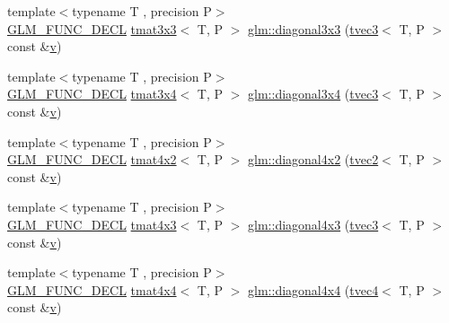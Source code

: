 \begin{DoxyCompactItemize}
\item 
{\footnotesize template$<$typename T , precision P$>$ }\\\mbox{\hyperlink{setup_8hpp_ab2d052de21a70539923e9bcbf6e83a51}{G\+L\+M\+\_\+\+F\+U\+N\+C\+\_\+\+D\+E\+CL}} \mbox{\hyperlink{structglm_1_1tmat3x3}{tmat3x3}}$<$ T, P $>$ \mbox{\hyperlink{group__gtx__matrix__operation_ga8e817dba22f2305cdebae07bbbe0360c}{glm\+::diagonal3x3}} (\mbox{\hyperlink{structglm_1_1tvec3}{tvec3}}$<$ T, P $>$ const \&\mbox{\hyperlink{glad_8h_a14cfbe2fc2234f5504618905b69d1e06}{v}})
\item 
{\footnotesize template$<$typename T , precision P$>$ }\\\mbox{\hyperlink{setup_8hpp_ab2d052de21a70539923e9bcbf6e83a51}{G\+L\+M\+\_\+\+F\+U\+N\+C\+\_\+\+D\+E\+CL}} \mbox{\hyperlink{structglm_1_1tmat3x4}{tmat3x4}}$<$ T, P $>$ \mbox{\hyperlink{group__gtx__matrix__operation_gae3f85af86c18c80f2acbe3223feb8e81}{glm\+::diagonal3x4}} (\mbox{\hyperlink{structglm_1_1tvec3}{tvec3}}$<$ T, P $>$ const \&\mbox{\hyperlink{glad_8h_a14cfbe2fc2234f5504618905b69d1e06}{v}})
\item 
{\footnotesize template$<$typename T , precision P$>$ }\\\mbox{\hyperlink{setup_8hpp_ab2d052de21a70539923e9bcbf6e83a51}{G\+L\+M\+\_\+\+F\+U\+N\+C\+\_\+\+D\+E\+CL}} \mbox{\hyperlink{structglm_1_1tmat4x2}{tmat4x2}}$<$ T, P $>$ \mbox{\hyperlink{group__gtx__matrix__operation_ga70cc5632aa9f41e7cf0b81fee6f2bfe6}{glm\+::diagonal4x2}} (\mbox{\hyperlink{structglm_1_1tvec2}{tvec2}}$<$ T, P $>$ const \&\mbox{\hyperlink{glad_8h_a14cfbe2fc2234f5504618905b69d1e06}{v}})
\item 
{\footnotesize template$<$typename T , precision P$>$ }\\\mbox{\hyperlink{setup_8hpp_ab2d052de21a70539923e9bcbf6e83a51}{G\+L\+M\+\_\+\+F\+U\+N\+C\+\_\+\+D\+E\+CL}} \mbox{\hyperlink{structglm_1_1tmat4x3}{tmat4x3}}$<$ T, P $>$ \mbox{\hyperlink{group__gtx__matrix__operation_ga4242ea5681f81539e0c5b54fadcd9ddf}{glm\+::diagonal4x3}} (\mbox{\hyperlink{structglm_1_1tvec3}{tvec3}}$<$ T, P $>$ const \&\mbox{\hyperlink{glad_8h_a14cfbe2fc2234f5504618905b69d1e06}{v}})
\item 
{\footnotesize template$<$typename T , precision P$>$ }\\\mbox{\hyperlink{setup_8hpp_ab2d052de21a70539923e9bcbf6e83a51}{G\+L\+M\+\_\+\+F\+U\+N\+C\+\_\+\+D\+E\+CL}} \mbox{\hyperlink{structglm_1_1tmat4x4}{tmat4x4}}$<$ T, P $>$ \mbox{\hyperlink{group__gtx__matrix__operation_gade576e044d8e52f343166f665589d782}{glm\+::diagonal4x4}} (\mbox{\hyperlink{structglm_1_1tvec4}{tvec4}}$<$ T, P $>$ const \&\mbox{\hyperlink{glad_8h_a14cfbe2fc2234f5504618905b69d1e06}{v}})
\end{DoxyCompactItemize}


